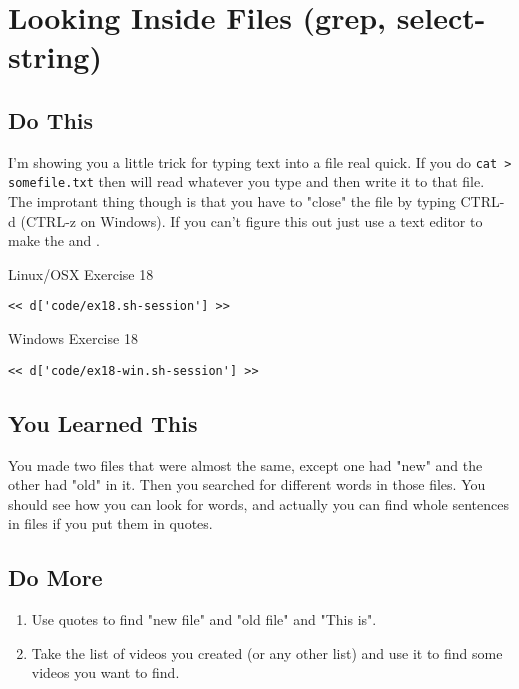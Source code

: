 \chapter{Looking Inside Files (grep, select-string)}

\section{Do This}

I'm showing you a little trick for typing text into a file real quick.  If you
do \verb|cat > somefile.txt| then  will read whatever you type and
then write it to that file.  The improtant thing though is that you have to
"close" the file by typing CTRL-d (CTRL-z on Windows).  If you can't figure this 
out just use a text editor to make the  and .

\begin{code}{Linux/OSX Exercise 18}
\begin{Verbatim}
<< d['code/ex18.sh-session'] >>
\end{Verbatim}
\end{code}

\begin{code}{Windows Exercise 18}
\begin{Verbatim}
<< d['code/ex18-win.sh-session'] >>
\end{Verbatim}
\end{code}

\section{You Learned This}

You made two files that were almost the same, except one had "new" and the other 
had "old" in it.  Then you searched for different words in those files.  You should
see how you can look for words, and actually you can find whole sentences in
files if you put them in quotes.

\section{Do More}

\begin{enumerate}
\item Use quotes to find "new file" and "old file" and "This is".
\item Take the list of videos you created (or any other list) and use it to find some videos you want to find.
\end{enumerate}

